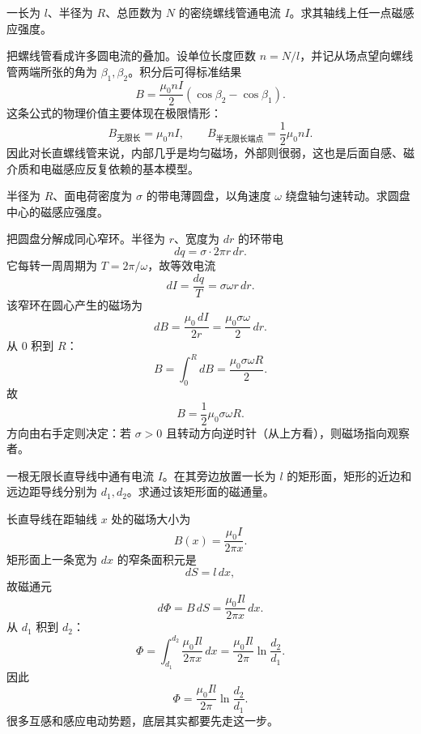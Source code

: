 \documentclass[lang=cn,11pt]{elegantbook}
\begin{document}
\begin{example}[有限长螺线管轴线上的磁场]
一长为 \(l\)、半径为 \(R\)、总匝数为 \(N\) 的密绕螺线管通电流 \(I\)。求其轴线上任一点磁感应强度。
\end{example}

\begin{solution}
把螺线管看成许多圆电流的叠加。设单位长度匝数 \(n=N/l\)，并记从场点望向螺线管两端所张的角为 \(\beta_1,\beta_2\)。积分后可得标准结果
\[
\boxed{
B=\frac{\mu_0 nI}{2}\left(\cos\beta_2-\cos\beta_1\right).
}
\]
这条公式的物理价值主要体现在极限情形：
\[
B_{\text{无限长}}=\mu_0 nI,
\qquad
B_{\text{半无限长端点}}=\frac12\mu_0 nI.
\]
因此对长直螺线管来说，内部几乎是均匀磁场，外部则很弱，这也是后面自感、磁介质和电磁感应反复依赖的基本模型。
\end{solution}

\begin{example}[旋转带电圆盘中心的磁场]
半径为 \(R\)、面电荷密度为 \(\sigma\) 的带电薄圆盘，以角速度 \(\omega\) 绕盘轴匀速转动。求圆盘中心的磁感应强度。
\end{example}

\begin{solution}
把圆盘分解成同心窄环。半径为 \(r\)、宽度为 \(dr\) 的环带电
\[
dq=\sigma\cdot 2\pi r\,dr.
\]
它每转一周周期为 \(T=2\pi/\omega\)，故等效电流
\[
dI=\frac{dq}{T}=\sigma\omega r\,dr.
\]
该窄环在圆心产生的磁场为
\[
dB=\frac{\mu_0\,dI}{2r}
=\frac{\mu_0\sigma\omega}{2}\,dr.
\]
从 \(0\) 积到 \(R\)：
\[
B=\int_0^R dB
=\frac{\mu_0\sigma\omega R}{2}.
\]
故
\[
\boxed{
B=\frac12\mu_0\sigma\omega R
}.
\]
方向由右手定则决定：若 \(\sigma>0\) 且转动方向逆时针（从上方看），则磁场指向观察者。
\end{solution}

\begin{example}[长直导线穿过矩形面积的磁通量]
一根无限长直导线中通有电流 \(I\)。在其旁边放置一长为 \(l\) 的矩形面，矩形的近边和远边距导线分别为 \(d_1,d_2\)。求通过该矩形面的磁通量。
\end{example}

\begin{solution}
长直导线在距轴线 \(x\) 处的磁场大小为
\[
B(x)=\frac{\mu_0I}{2\pi x}.
\]
矩形面上一条宽为 \(dx\) 的窄条面积元是
\[
dS=l\,dx,
\]
故磁通元
\[
d\Phi=B\,dS=\frac{\mu_0Il}{2\pi x}\,dx.
\]
从 \(d_1\) 积到 \(d_2\)：
\[
\Phi=\int_{d_1}^{d_2}\frac{\mu_0Il}{2\pi x}\,dx
=\frac{\mu_0Il}{2\pi}\ln\frac{d_2}{d_1}.
\]
因此
\[
\boxed{
\Phi=\frac{\mu_0Il}{2\pi}\ln\frac{d_2}{d_1}
}.
\]
很多互感和感应电动势题，底层其实都要先走这一步。
\end{solution}
\end{document}
